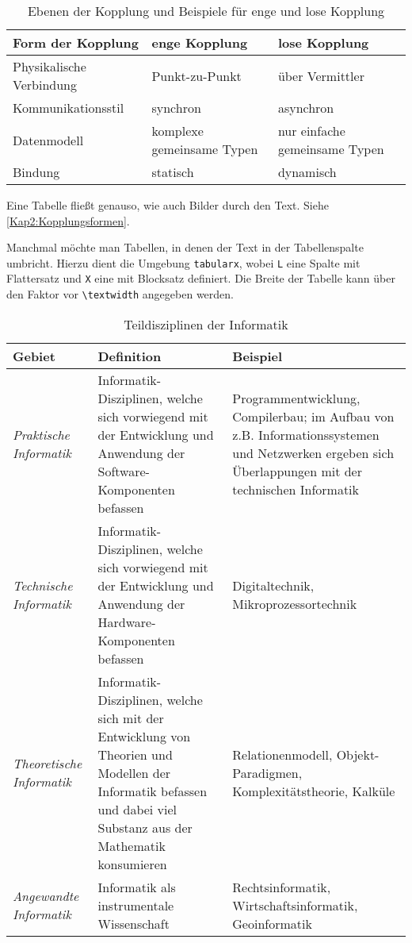 \begin{table}[h]
  \caption{Ebenen der Kopplung und Beispiele für enge und lose Kopplung}
  \label{Kap2:Kopplungsformen}
  \renewcommand{\arraystretch}{1.2}
  \centering
  \sffamily
  \begin{footnotesize}
    \begin{tabular}{l l l}
    \toprule
    \textbf{Form der Kopplung} & \textbf{enge Kopplung} & \textbf{lose Kopplung}\\
    \midrule
    Physikalische Verbindung	&	Punkt-zu-Punkt	& 	über Vermittler\\
    Kommunikationsstil	&	synchron		&	asynchron\\
    Datenmodell	&	komplexe gemeinsame Typen	&	nur einfache gemeinsame Typen\\
    Bindung	&	statisch		&	dynamisch\\
    \bottomrule
    \end{tabular}
  \end{footnotesize}
  \rmfamily
\end{table}

Eine Tabelle fließt genauso, wie auch Bilder durch den Text. Siehe \autoref{Kap2:Kopplungsformen}.

Manchmal möchte man Tabellen, in denen der Text in der Tabellenspalte umbricht. Hierzu dient die Umgebung \texttt{tabularx}, wobei \texttt{L} eine Spalte mit Flattersatz und \texttt{X} eine mit Blocksatz definiert. Die Breite der Tabelle kann über den Faktor vor \verb+\textwidth+ angegeben werden.

\begin{table}[h]
  \caption{Teildisziplinen der Informatik}
  \label{Kap2:Teildisziplinen}
  \renewcommand{\arraystretch}{1.2}
  \centering
  \sffamily
  \begin{footnotesize}
    \begin{tabularx}{0.9\textwidth}{l X L}
      \toprule
      \textbf{Gebiet} & \textbf{Definition} & \textbf{Beispiel}\\
      \midrule
      \emph{Praktische Informatik} & Informatik-Disziplinen, welche sich vorwiegend mit der Entwicklung und Anwendung der Software-Komponenten befassen & Programmentwicklung, Compilerbau; im Aufbau von z.B. Informationssystemen und Netzwerken ergeben sich Überlappungen mit der technischen Informatik \\
      \emph{Technische Informatik} & Informatik-Disziplinen, welche sich vorwiegend mit der Entwicklung und Anwendung der Hardware-Komponenten befassen & Digitaltechnik, Mikroprozessortechnik \\
      \emph{Theoretische Informatik} & Informatik-Disziplinen, welche sich mit der Entwicklung von Theorien und Modellen der Informatik befassen und dabei viel Substanz aus der Mathematik konsumieren & Relationenmodell, Objekt-Paradigmen, Komplexitätstheorie, Kalküle \\
      \emph{Angewandte Informatik} & Informatik als instrumentale Wissenschaft & Rechtsinformatik, Wirtschaftsinformatik, Geoinformatik \\
      \bottomrule
    \end{tabularx}
  \end{footnotesize}
  \rmfamily
\end{table}

